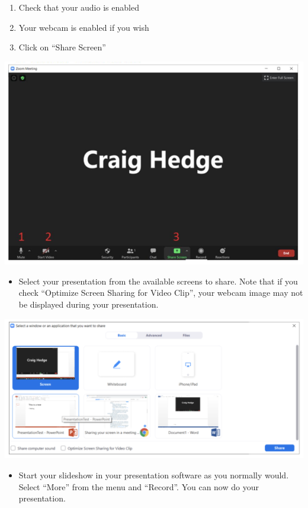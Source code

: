 \documentclass[
  12pt,
]{book}
\providecommand{\tightlist}{%
  \setlength{\itemsep}{0pt}\setlength{\parskip}{0pt}}
\begin{document}
\begin{enumerate}
\def\labelenumi{\arabic{enumi}.}
\item
  Check that your audio is enabled
\item
  Your webcam is enabled if you wish
\item
  Click on ``Share Screen''
\end{enumerate}

\includegraphics{zoom4.png}

\begin{itemize}
\tightlist
\item
  Select your presentation from the available screens to share. Note that if you check ``Optimize Screen Sharing for Video Clip'', your webcam image may not be displayed during your presentation.
\end{itemize}

\includegraphics{zoom5.png}

\begin{itemize}
\tightlist
\item
  Start your slideshow in your presentation software as you normally would. Select ``More'' from the menu and ``Record''. You can now do your presentation.
\end{itemize}
\end{document}
